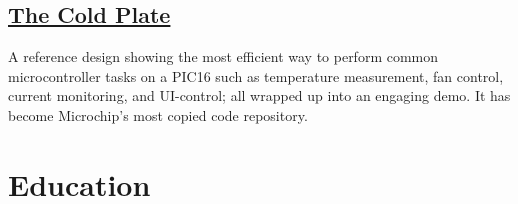 \documentclass[
	10pt, %
]{FreemanCV}
\begin{document}
\begin{paracol}{2}
\leavevmode \subsection{\href{https://github.com/microchip-pic-avr-examples/pic16f17146-cold-plate-mplab-mcc}{The Cold Plate \scriptsize\faLink}}

A reference design showing the most efficient way to perform common microcontroller tasks on a PIC16
such as temperature measurement, fan control, current monitoring, and UI-control;
all wrapped up into an engaging demo.
It has become Microchip's most copied code repository.





\section{Education} 




\begin{supertabular}{r l} %


\end{supertabular}
\end{paracol}
\end{document}
